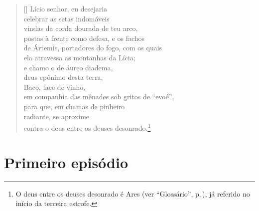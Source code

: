 
\settowidth{\versewidth}{brilhante? Tenso, agito-me com medo em meu trêmulo}
\begin{verse}[\versewidth]
Lício senhor, eu desejaria\\ 
celebrar as setas indomáveis\\
vindas da corda dourada de teu arco,\\
postas à frente como defesa, e os fachos\\
de Ártemis, portadores do fogo, com os quais\\
ela atravessa as montanhas da Lícia;\\
e chamo o de áureo diadema,\\
deus epônimo desta terra,\\
Baco, face de vinho,\\
em companhia das mênades sob gritos de ``evoé'',\\
para que, em chamas de pinheiro\\
radiante, se aproxime\\
contra o deus entre os deuses desonrado.\footnote{O deus entre os deuses desonrado é Ares (ver ``Glossário'', p.\,\pageref{glossario}), já referido no início da terceira estrofe.}
\end{verse}


\pagebreak
\section{Primeiro episódio}


